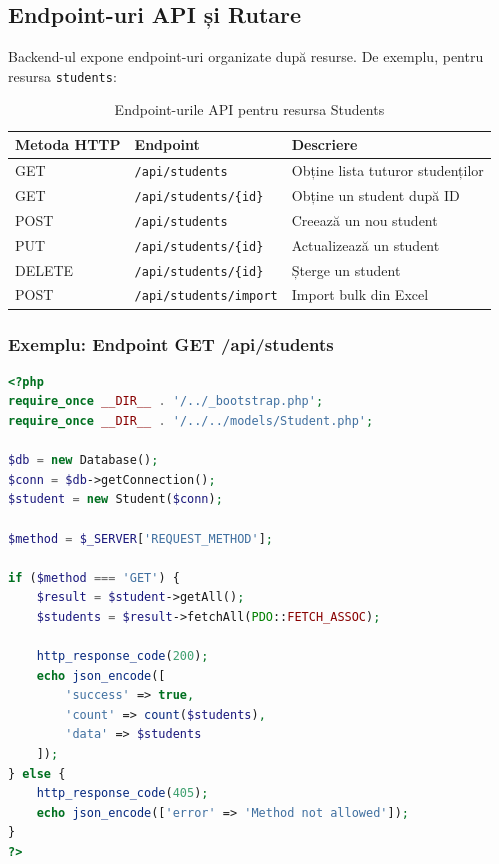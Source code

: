 \subsection{Endpoint-uri API și Rutare}

Backend-ul expone endpoint-uri organizate după resurse. De exemplu, pentru resursa \texttt{students}:

\begin{table}[H]
    \centering
    \begin{tabular}{|l|l|l|}
        \hline
        \textbf{Metoda HTTP} & \textbf{Endpoint} & \textbf{Descriere} \\
        \hline
        GET & \texttt{/api/students} & Obține lista tuturor studenților \\
        GET & \texttt{/api/students/\{id\}} & Obține un student după ID \\
        POST & \texttt{/api/students} & Creează un nou student \\
        PUT & \texttt{/api/students/\{id\}} & Actualizează un student \\
        DELETE & \texttt{/api/students/\{id\}} & Șterge un student \\
        POST & \texttt{/api/students/import} & Import bulk din Excel \\
        \hline
    \end{tabular}
    \caption{Endpoint-urile API pentru resursa Students}
    \label{tbl:api-endpoints}
\end{table}

\subsubsection{Exemplu: Endpoint GET /api/students}

\begin{lstlisting}[language=PHP]
<?php
require_once __DIR__ . '/../_bootstrap.php';
require_once __DIR__ . '/../../models/Student.php';

$db = new Database();
$conn = $db->getConnection();
$student = new Student($conn);

$method = $_SERVER['REQUEST_METHOD'];

if ($method === 'GET') {
    $result = $student->getAll();
    $students = $result->fetchAll(PDO::FETCH_ASSOC);

    http_response_code(200);
    echo json_encode([
        'success' => true,
        'count' => count($students),
        'data' => $students
    ]);
} else {
    http_response_code(405);
    echo json_encode(['error' => 'Method not allowed']);
}
?>
\end{lstlisting}

